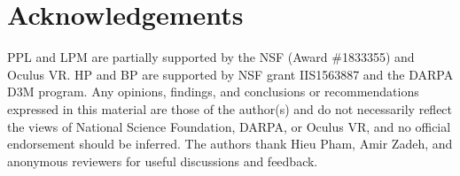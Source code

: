 \documentclass[letterpaper]{article} %
\begin{document}
\section{Acknowledgements}
PPL and LPM are partially supported by the NSF (Award \#1833355) and Oculus VR. HP and BP are supported by NSF grant IIS1563887 and the DARPA
D3M program. Any opinions, findings, and conclusions or recommendations expressed in this material are those of the author(s) and do not necessarily reflect the views of National Science Foundation, DARPA, or Oculus VR, and no official endorsement should be inferred. The authors thank Hieu Pham, Amir Zadeh, and anonymous reviewers for useful discussions and feedback. 






















\small


\end{document}
